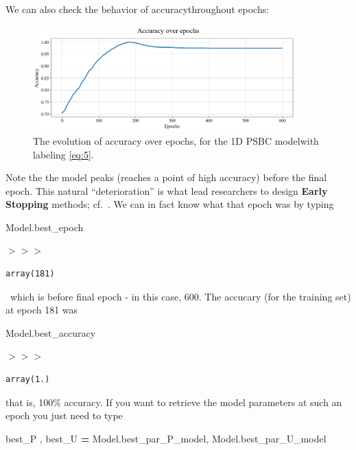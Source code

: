 \documentclass[openany,twoside]{book}
\newenvironment{Shaded}{\begin{snugshade}}{\end{snugshade}}
\newcommand{\NormalTok}[1]{#1}
\newcommand{\OperatorTok}[1]{\textcolor[rgb]{0.81,0.36,0.00}{\textbf{#1}}}
\begin{document}
We can also check the behavior of accuracythroughout epochs:

\begin{figure}[htbp]
\centering
\includegraphics[width=0.9\textwidth]{figures/output_45_0.png}
\caption{The evolution of accuracy over epochs, for the 1D PSBC modelwith labeling \ref{eq:5}.}
\end{figure}
Note the the model peaks (reaches a point of high accuracy) before the final epoch. This natural ``deterioration'' is what lead researchers to design \textbf{Early Stopping} methods; cf.~\citep{early_when}. We can in fact know what that epoch was by typing

\begin{Shaded}
\begin{Highlighting}[]
\NormalTok{Model.best_epoch}
\end{Highlighting}
\end{Shaded}

\(>>>\) 
\begin{verbatim}
array(181)
\end{verbatim}
\
which is before final epoch - in this case, 600. The accucary (for the training set) at epoch 181 was

\begin{Shaded}
\begin{Highlighting}[]
\NormalTok{Model.best_accuracy}
\end{Highlighting}
\end{Shaded}

\(>>>\) 
\begin{verbatim}
array(1.)
\end{verbatim}

that is, 100\% accuracy. If you want to retrieve the model parameters at such an epoch you just need to type

\begin{Shaded}
\begin{Highlighting}[]
\NormalTok{best_P , best_U }\OperatorTok{=}\NormalTok{ Model.best_par_P_model, Model.best_par_U_model}
\end{Highlighting}
\end{Shaded}
\end{document}
